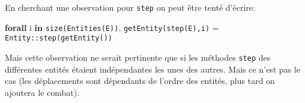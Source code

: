 \documentclass{article}
\begin{document}
\vspace{5mm}

\noindent En cherchant une observation pour \texttt{step} on peut être tenté d'écrire:

\noindent\textbf{forall} i \textbf{in} \texttt{size(Entities(E))},
\texttt{getEntity(step(E),i)} = \texttt{Entity::step(getEntity())}

\noindent Mais cette observation ne serait pertinente que si les
méthodes \texttt{step} des différentes entités étaient indépendantes
les unes des autres. Mais ce n'est pas le cas (les déplacements sont
dépendants de l'ordre des entités, plus tard on ajoutera le combat).
\end{document}
